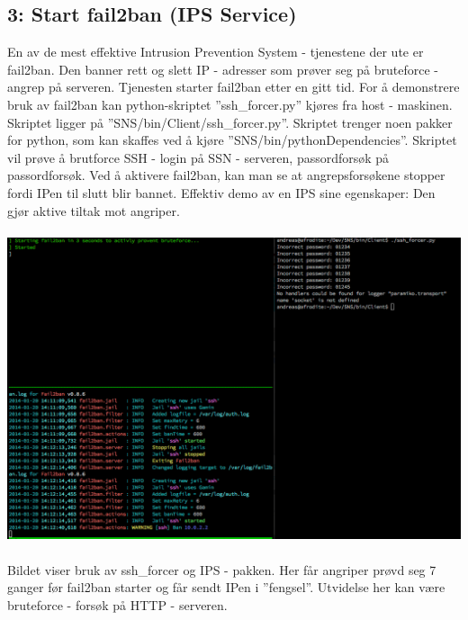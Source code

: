 \documentclass{article}
\begin{document}
\subsection{3: Start fail2ban (IPS Service)}
En av de mest effektive Intrusion Prevention System - tjenestene der ute er fail2ban. Den banner rett og slett IP - adresser som prøver seg på bruteforce - angrep på serveren. Tjenesten starter fail2ban etter en gitt tid. For å demonstrere bruk av fail2ban kan python-skriptet ''ssh\_forcer.py'' kjøres fra host - maskinen. Skriptet ligger på ''SNS/bin/Client/ssh\_forcer.py''. Skriptet trenger noen pakker for python, som kan skaffes ved å kjøre ''SNS/bin/pythonDependencies''. Skriptet vil prøve å brutforce SSH - login på SSN - serveren, passordforsøk på passordforsøk. Ved å aktivere fail2ban, kan man se at angrepsforsøkene stopper fordi IPen til slutt blir bannet. Effektiv demo av en IPS sine egenskaper: Den gjør aktive tiltak mot angriper.
\\ \\
\includegraphics[scale = 0.5]{pictures/ips.png}
\\ \\
Bildet viser bruk av ssh\_forcer og IPS - pakken. Her får angriper prøvd seg 7 ganger før fail2ban starter og får sendt IPen i ''fengsel''. Utvidelse her kan være bruteforce - forsøk på HTTP - serveren. 
\end{document}
